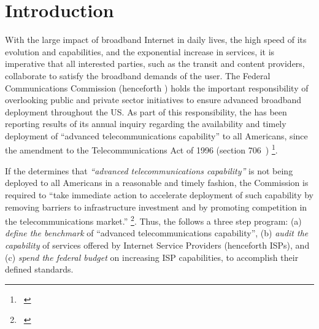 \section{Introduction}
\label{sec:intro}


With the large impact of broadband Internet in daily lives, the high speed of its evolution and capabilities, and the exponential increase in services, it is imperative that all interested parties, such as the transit and content providers, collaborate to satisfy the broadband demands of the user. The Federal Communications Commission (henceforth \FCC) holds the important responsibility of overlooking public and private sector initiatives to ensure advanced broadband deployment throughout the US. As part of this responsibility, the \FCC has been reporting results of its annual inquiry regarding the availability and timely deployment of ``advanced telecommunications capability'' to all Americans, since the amendment to the Telecommunications Act of 1996 (section 706~\cite{fcc1996telecom-act}) \footnote{ ~\cite{fcc2015progress-report}}.



If the \FCC determines that \emph{``advanced telecommunications capability''} is not being deployed to all Americans in a reasonable and timely fashion, the Commission is required to ``take immediate action to accelerate deployment of such capability by removing barriers to infrastructure investment and by promoting competition in the telecommunications market.'' \footnote{ ~\cite{fcc2015progress-report}}. Thus, the \FCC follows a three step program: (a) \emph{define the benchmark} of ``advanced telecommunications capability'', (b) \emph{audit the capability} of services offered by Internet Service Providers (henceforth ISPs), and (c) \emph{spend the federal budget} on increasing ISP capabilities, to accomplish their defined standards.


